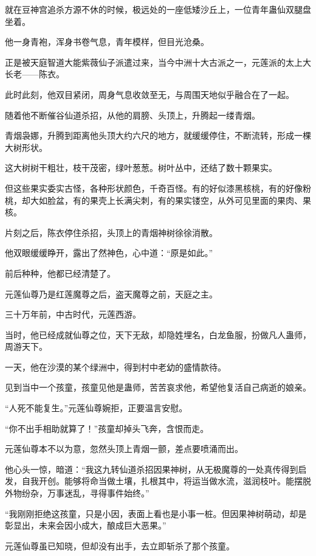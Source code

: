
\begin{this_body}

就在豆神宫追杀方源不休的时候，极远处的一座低矮沙丘上，一位青年蛊仙双腿盘坐着。

他一身青袍，浑身书卷气息，青年模样，但目光沧桑。

正是被天庭智道大能紫薇仙子派遣过来，当今中洲十大古派之一，元莲派的太上大长老——陈衣。

此时此刻，他双目紧闭，周身气息收敛至无，与周围天地似乎融合在了一起。

随着他不断催谷仙道杀招，从他的肩膀、头顶上，升腾起一缕青烟。

青烟袅娜，升腾到距离他头顶大约六尺的地方，就缓缓停住，不断流转，形成一棵大树形状。

这大树树干粗壮，枝干茂密，绿叶葱葱。树叶丛中，还结了数十颗果实。

但这些果实委实古怪，各种形状颜色，千奇百怪。有的好似漆黑核桃，有的好像粉桃，却大如脸盆，有的果壳上长满尖刺，有的果实镂空，从外可见里面的果肉、果核。

片刻之后，陈衣停住杀招，头顶上的青烟神树徐徐消散。

他双眼缓缓睁开，露出了然神色，心中道：“原是如此。”

前后种种，他都已经清楚了。

元莲仙尊乃是红莲魔尊之后，盗天魔尊之前，天庭之主。

三十万年前，中古时代，元莲西游。

当时，他已经成就仙尊之位，天下无敌，却隐姓埋名，白龙鱼服，扮做凡人蛊师，周游天下。

一天，他在沙漠的某个绿洲中，得到村中老幼的盛情款待。

见到当中一个孩童，孩童见他是蛊师，苦苦哀求他，希望他复活自己病逝的娘亲。

“人死不能复生。”元莲仙尊婉拒，正要温言安慰。

“你不出手相助就算了！”孩童却掉头飞奔，含恨而走。

元莲仙尊本不以为意，忽然头顶上青烟一颤，差点要喷涌而出。

他心头一惊，暗道：“我这九转仙道杀招因果神树，从无极魔尊的一处真传得到启发，自我开创。能够将命当做土壤，扎根其中，将运当做水流，滋润枝叶。能摆脱外物纷杂，万事迷乱，寻得事件始终。”

“我刚刚拒绝这孩童，只是小因，表面上看也是小事一桩。但因果神树萌动，却是彰显出，未来会因小成大，酿成巨大恶果。”

元莲仙尊虽已知晓，但却没有出手，去立即斩杀了那个孩童。


\end{this_body}
